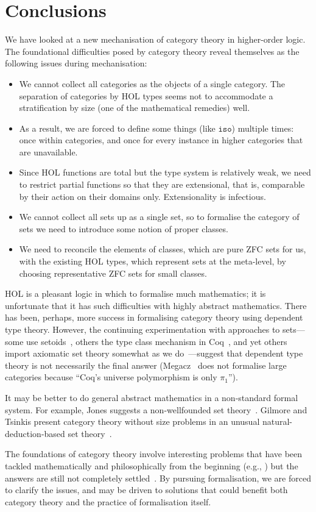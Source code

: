 \documentclass[twoside,titlepage,11pt]{article}
\begin{document}
\section{Conclusions}%
We have looked at a new mechanisation of category theory in higher-order logic.
The foundational difficulties posed by category theory reveal themselves as the following issues during mechanisation:
\begin{itemize}
\item We cannot collect all categories as the objects of a single category.
The separation of categories by HOL types seems not to accommodate a stratification by size (one of the mathematical remedies) well.
\item
As a result, we are forced to define some things (like $\mathtt{iso}$) multiple times: once within categories, and once for every instance in higher categories that are unavailable.
\item
Since HOL functions are total but the type system is relatively weak, we need to restrict partial functions so that they are extensional, that is, comparable by their action on their domains only.
Extensionality is infectious.
\item
We cannot collect all sets up as a single set, so to formalise the category of sets we need to introduce some notion of proper classes.
\item
We need to reconcile the elements of classes, which are pure ZFC sets for us, with the existing HOL types, which represent sets at the meta-level, by choosing representative ZFC sets for small classes.
\end{itemize}

HOL is a pleasant logic in which to formalise much mathematics; it is unfortunate that it has such difficulties with highly abstract mathematics.
There has been, perhaps, more success in formalising category theory using dependent type theory.
However, the continuing experimentation with approaches to sets---some use setoids~\cite{DBLP:conf/birthday/HuetS00,Carvalho,Wilander}, others the type class mechanism in Coq~\cite{DBLP:conf/mkm/CoquandS07,Sozeau,Megacz}, and yet others import axiomatic set theory somewhat as we do~\cite{Simpson04}---suggest that dependent type theory is not necessarily the final answer (Megacz~\cite{Megacz} does not formalise large categories because ``Coq's universe polymorphism is only $\pi_1$'').

It may be better to do general abstract mathematics in a non-standard formal system.
For example, Jones suggests a non-wellfounded set theory~\cite{RBJones18}.
Gilmore and Tsinkis present category theory without size problems in an unusual natural-deduction-based set theory~\cite{DBLP:journals/tcs/GilmoreT93}. 

The foundations of category theory involve interesting problems that have been tackled mathematically and philosophically from the beginning (e.g., \cite{Blass,springerlink:10.1007/BFb0059147}) but the answers are still not completely settled~\cite{Easwaran}.
By pursuing formalisation, we are forced to clarify the issues, and may be driven to solutions that could benefit both category theory and the practice of formalisation itself.


\end{document}
